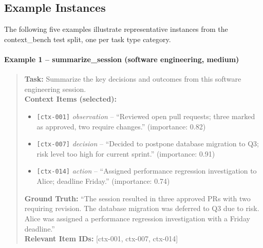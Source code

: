 \subsection{Example Instances}

The following five examples illustrate representative instances from the
context\_bench test split, one per task type category.

\paragraph{Example 1 -- summarize\_session (software engineering, medium)}
\begin{quote}
\small
\textbf{Task:} Summarize the key decisions and outcomes from this software
engineering session.\\[2pt]
\textbf{Context Items (selected):}
\begin{itemize}
  \item \texttt{[ctx-001]} \textit{observation} -- ``Reviewed open pull requests; three marked as approved, two require changes.'' (importance: 0.82)
  \item \texttt{[ctx-007]} \textit{decision} -- ``Decided to postpone database migration to Q3; risk level too high for current sprint.'' (importance: 0.91)
  \item \texttt{[ctx-014]} \textit{action} -- ``Assigned performance regression investigation to Alice; deadline Friday.'' (importance: 0.74)
\end{itemize}
\textbf{Ground Truth:} ``The session resulted in three approved PRs with two requiring revision. The database migration was deferred to Q3 due to risk. Alice was assigned a performance regression investigation with a Friday deadline.''\\[2pt]
\textbf{Relevant Item IDs:} [ctx-001, ctx-007, ctx-014]
\end{quote}

